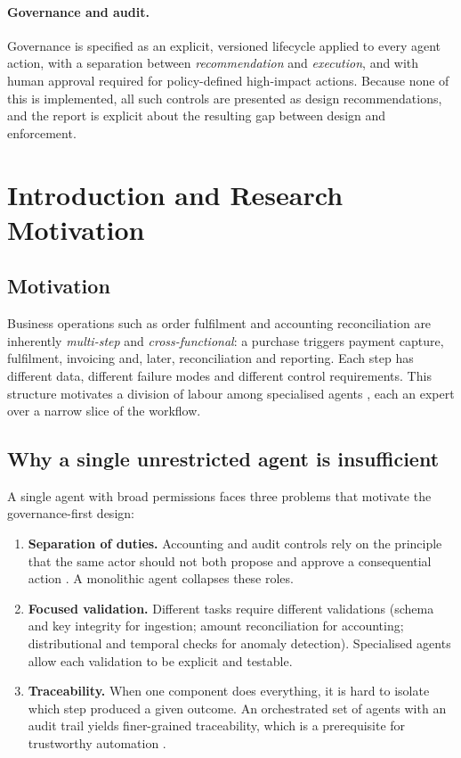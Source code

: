 \documentclass[11pt,a4paper]{article}
\begin{document}
\paragraph{Governance and audit.} Governance is specified as an explicit, versioned lifecycle applied to every agent action, with a separation between \emph{recommendation} and \emph{execution}, and with human approval required for policy-defined high-impact actions. Because none of this is implemented, all such controls are presented as design recommendations, and the report is explicit about the resulting gap between design and enforcement.

\section{Introduction and Research Motivation}
\subsection{Motivation}
Business operations such as order fulfilment and accounting reconciliation are inherently \emph{multi-step} and \emph{cross-functional}: a purchase triggers payment capture, fulfilment, invoicing and, later, reconciliation and reporting. Each step has different data, different failure modes and different control requirements. This structure motivates a division of labour among specialised agents \cite{wooldridge2009,shoham2009}, each an expert over a narrow slice of the workflow.

\subsection{Why a single unrestricted agent is insufficient}
A single agent with broad permissions faces three problems that motivate the governance-first design:
\begin{enumerate}
\item \textbf{Separation of duties.} Accounting and audit controls rely on the principle that the same actor should not both propose and approve a consequential action \cite{coso2013,sox2002}. A monolithic agent collapses these roles.
\item \textbf{Focused validation.} Different tasks require different validations (schema and key integrity for ingestion; amount reconciliation for accounting; distributional and temporal checks for anomaly detection). Specialised agents allow each validation to be explicit and testable.
\item \textbf{Traceability.} When one component does everything, it is hard to isolate which step produced a given outcome. An orchestrated set of agents with an audit trail yields finer-grained traceability, which is a prerequisite for trustworthy automation \cite{nistAirmf2023}.
\end{enumerate}
\end{document}
